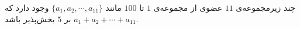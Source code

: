 \EXERCISE
چند زیرمجموعه‌ی
$11$
عضوی از مجموعه‌ی
$1$
تا
$100$
مانند
$\{a_1, a_2, \cdots, a_{11}\}$
وجود دارد که
$a_1 + a_2 + \cdots + a_{11}$
بر
$5$
بخش‌پذیر باشد.